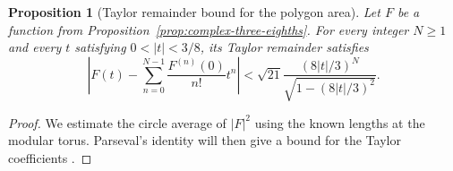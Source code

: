 \documentclass[10pt,twoside]{article}
\theoremstyle{plain}
\newtheorem{proposition}[theorem]{Proposition}
\theoremstyle{definition}
\theoremstyle{remark}
\begin{document}
\begin{proposition}[Taylor remainder bound for the polygon area]
\label{prop:polygon-taylor-remainder}
Let $F$ be a function from Proposition~\ref{prop:complex-three-eighths}.
For every integer $N\geq1$ and every $t$ satisfying $0<|t|<3/8$,
its Taylor remainder satisfies
\begin{equation}
\label{eq:mean-square-taylor-tail}
\left|F(t)-\sum_{n=0}^{N-1}\frac{F^{(n)}(0)}{n!}t^n\right|
<\sqrt{21}\frac{(8|t|/3)^N}{\sqrt{1-(8|t|/3)^2}}.
\end{equation}
\end{proposition}
\begin{proof}
We estimate the circle average of $|F|^2$ using the known lengths
at the modular torus. Parseval's identity will then give a bound
for the Taylor coefficients
\cite[Theorem~1.3(ii), p.~80]{SteinShakarchiFourier}.


\end{proof}
\end{document}
